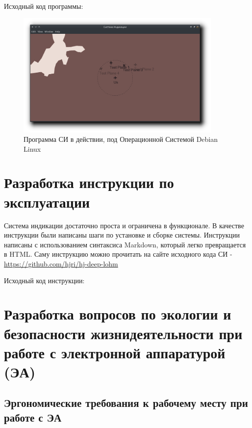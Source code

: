 \documentclass[a4paper,12pt]{report} %
\begin{document}
Исходный код программы:







\begin{figure}[!ht]
  \includegraphics[width=0.9\textwidth]{deeplohm}
  \caption{Программа СИ в действии, под Операционной Системой Debian Linux}
\end{figure}

\newpage
\chapter{Разработка инструкции по эксплуатации}
Система индикации достаточно проста и ограничена в функционале. В качестве
инструкции были написаны шаги по установке и сборке системы. Инструкции написаны
с использованием синтаксиса Markdown, который легко превращается в HTML. Саму
инструкцию можно прочитать на сайте исходного кода СИ - \url{https://github.com/hjri/hj-deep-lohm}

Исходный код инструкции:

\newpage

\chapter{Разработка вопросов по экологии и безопасности жизнидеятельности при
  работе с электронной аппаратурой (ЭА)} %
\section{Эргономические требования к рабочему месту при работе с ЭА}
\end{document}
